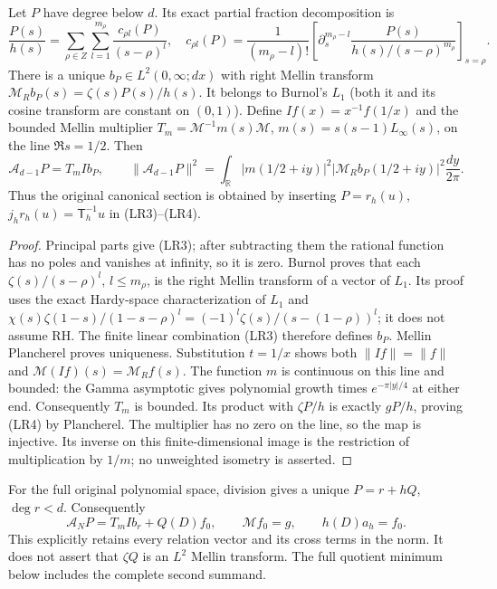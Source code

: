 \begin{proposition}
Let $P$ have degree below $d$. Its exact partial fraction decomposition is
\[
 \frac{P(s)}{h(s)}=\sum_{\rho\in Z}\sum_{l=1}^{m_\rho}
 \frac{c_{\rho l}(P)}{(s-\rho)^l},\quad
 c_{\rho l}(P)=\frac1{(m_\rho-l)!}
 \left[\partial_s^{m_\rho-l}\frac{P(s)}{h(s)/(s-\rho)^{m_\rho}}
 \right]_{s=\rho}.\tag{LR3}
\]
There is a unique $b_P\in L^2(0,\infty;dx)$ with right Mellin transform
$\mathcal M_Rb_P(s)=\zeta(s)P(s)/h(s)$. It belongs to Burnol's
$L_1$ (both it and its cosine transform are constant on $(0,1)$).
Define $If(x)=x^{-1}f(1/x)$ and the bounded Mellin multiplier
$T_m=\mathcal M^{-1}m(s)\mathcal M$, $m(s)=s(s-1)L_\infty(s)$,
on the line $\Re s=1/2$. Then
\[
 \mathcal A_{d-1}P=T_m I b_P,\qquad
 \|\mathcal A_{d-1}P\|^2=
 \int_{\mathbb R}|m(1/2+iy)|^2
 |\mathcal M_Rb_P(1/2+iy)|^2\frac{dy}{2\pi}.\tag{LR4}
\]
Thus the original canonical section is obtained by inserting
$P=r_h(u)$, $j_hr_h(u)=\mathsf T_h^{-1}u$ in (LR3)--(LR4).
\end{proposition}
\begin{proof}
Principal parts give (LR3); after subtracting them the rational function
has no poles and vanishes at infinity, so it is zero. Burnol
\cite[\S4, Proposition \texttt{zetaprop} and its proof]{Burnol}
proves that each $\zeta(s)/(s-\rho)^l$, $l\le m_\rho$, is the
right Mellin transform of a vector of $L_1$. Its proof uses the exact
Hardy-space characterization of $L_1$ and
$\chi(s)\zeta(1-s)/(1-s-\rho)^l
=(-1)^l\zeta(s)/(s-(1-\rho))^l$; it does not assume RH.
The finite linear combination (LR3) therefore defines $b_P$.
Mellin Plancherel proves uniqueness.
Substitution $t=1/x$ shows both $\|If\|=\|f\|$ and
$\mathcal M(If)(s)=\mathcal M_Rf(s)$. The function $m$ is continuous
on this line and bounded: the Gamma asymptotic
\cite[5.11.9]{DLMF5} gives polynomial growth times
$e^{-\pi|y|/4}$ at either end. Consequently $T_m$ is bounded.
Its product with $\zeta P/h$ is exactly $gP/h$, proving (LR4) by
Plancherel. The multiplier has no zero on the line, so the map is
injective. Its inverse on this finite-dimensional image is the
restriction of multiplication by $1/m$; no unweighted isometry is asserted.
\end{proof}

For the full original polynomial space, division gives a unique
$P=r+hQ$, $\deg r<d$. Consequently
\[
 \mathcal A_NP=T_m I b_r+Q(D)f_0,\qquad
 \mathcal M f_0=g,\qquad h(D)a_h=f_0.\tag{LR5}
\]
This explicitly retains every relation vector and its cross terms in
the norm. It does not assert that $\zeta Q$ is an $L^2$ Mellin transform.
The full quotient minimum below includes the complete second summand.

